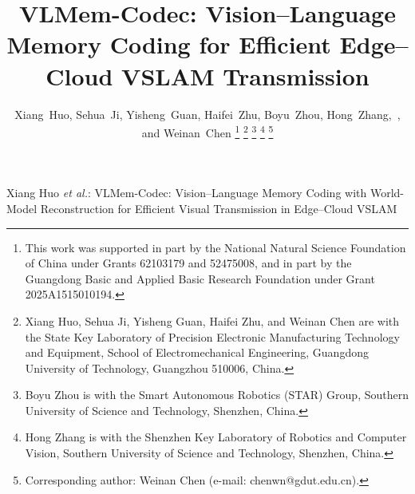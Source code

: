 \documentclass[journal]{IEEEtran}
\newcommand{\VLMemCodec}{VLMem-Codec}
\begin{document}
\title{VLMem-Codec: Vision–Language Memory Coding for Efficient Edge–Cloud VSLAM Transmission}

\author{Xiang~Huo,
        Sehua~Ji,
        Yisheng~Guan,
        Haifei~Zhu,
        Boyu~Zhou,
        Hong~Zhang,~,
        and Weinan~Chen%
\thanks{This work was supported in part by the National Natural Science Foundation of China under Grants 62103179 and 52475008, and in part by the Guangdong Basic and Applied Basic Research Foundation under Grant 2025A1515010194.}%
\thanks{Xiang Huo, Sehua Ji, Yisheng Guan, Haifei Zhu, and Weinan Chen are with the State Key Laboratory of Precision Electronic Manufacturing Technology and Equipment, School of Electromechanical Engineering, Guangdong University of Technology, Guangzhou 510006, China.}%
\thanks{Boyu Zhou is with the Smart Autonomous Robotics (STAR) Group, Southern University of Science and Technology, Shenzhen, China.}%
\thanks{Hong Zhang is with the Shenzhen Key Laboratory of Robotics and Computer Vision, Southern University of Science and Technology, Shenzhen, China.}%
\thanks{Corresponding author: Weinan Chen (e-mail: chenwn@gdut.edu.cn).}}

%
{Xiang Huo \MakeLowercase{\textit{et al.}}: \VLMemCodec: Vision--Language Memory Coding with World-Model Reconstruction for Efficient Visual Transmission in Edge--Cloud VSLAM}

\maketitle
\end{document}
